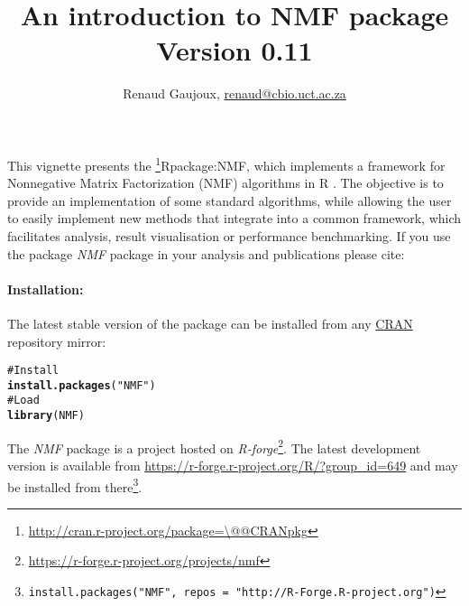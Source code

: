 \documentclass[a4paper]{article}\usepackage{graphicx, color}
\makeatletter
\newcommand{\hlfunctioncall}[1]{\textcolor[rgb]{0.501960784313725,0,0.329411764705882}{\textbf{#1}}}%
\newcommand{\hlstring}[1]{\textcolor[rgb]{0.6,0.6,1}{#1}}%
\newcommand{\hlcomment}[1]{\textcolor[rgb]{0.180392156862745,0.6,0.341176470588235}{#1}}%
\newenvironment{kframe}{%
 \def\at@end@of@kframe{}%
 \ifinner\ifhmode%
  \def\at@end@of@kframe{\end{minipage}}%
  \begin{minipage}{\columnwidth}%
 \fi\fi%
 \def\FrameCommand##1{\hskip\@totalleftmargin \hskip-\fboxsep
 \colorbox{shadecolor}{##1}\hskip-\fboxsep
     \hskip-\linewidth \hskip-\@totalleftmargin \hskip\columnwidth}%
 \MakeFramed {\advance\hsize-\width
   \@totalleftmargin\z@ \linewidth\hsize
   \@setminipage}}%
 {\par\unskip\endMakeFramed%
 \at@end@of@kframe}
\newenvironment{knitrout}{}{} %
\let\code=\texttt
\newcommand{\pkgname}[1]{\textit{#1}\xspace}
\newcommand{\Rpkg}[1]{\pkgname{#1} package\xspace}
\newcommand{\CRANurl}[1]{\url{http://cran.r-project.org/package=#1}}
\def\CRANpkg{\@ifstar\@CRANpkg\@@CRANpkg}
\def\@CRANpkg#1{\href{http://cran.r-project.org/package=#1}{\pkgname{#1}}\footnote{\CRANurl{#1}}}
\def\@@CRANpkg#1{\href{http://cran.r-project.org/package=#1}{\pkgname{#1}} package\footnote{\CRANurl{#1}}}
\def\citeCRANpkg{\@ifstar\@citeCRANpkg\@@citeCRANpkg}
\def\@citeCRANpkg#1{\CRANpkg{#1}\cite*{Rpackage:#1}}
\def\@@citeCRANpkg#1{\CRANpkg{#1}~\cite{Rpackage:#1}}
\newcommand{\nmfpack}{\Rpkg{NMF}}
\renewcommand{\cite}[1]{\parencite{#1}}
\makeatother
\begin{document}




\title{An introduction to NMF package\\\small Version
0.11}
\author{Renaud Gaujoux, \url{renaud@cbio.uct.ac.za}}

\maketitle

This vignette presents the \citeCRANpkg{NMF}, which implements a framework
for Nonnegative Matrix Factorization (NMF) algorithms in R \cite{R}.
The objective is to provide an implementation of some standard algorithms, while
allowing the user to easily implement new methods that integrate into a
common framework, which facilitates analysis, result visualisation or
performance benchmarking.
If you use the package \nmfpack in your analysis and publications please cite:

\bigskip
{}

\bigskip
\paragraph{Installation:} The latest stable version of the package can be installed from any
\href{http://cran.r-project.org}{CRAN} repository mirror:
\begin{knitrout}
\color{fgcolor}\begin{kframe}
\begin{alltt}
\hlcomment{# Install}
\hlfunctioncall{install.packages}(\hlstring{"NMF"})
\hlcomment{# Load}
\hlfunctioncall{library}(NMF)
\end{alltt}
\end{kframe}
\end{knitrout}

The \nmfpack is a project hosted on \emph{R-forge}\footnote{\url{https://r-forge.r-project.org/projects/nmf}}.
The latest development version is available from \url{https://r-forge.r-project.org/R/?group_id=649} and may be installed from there\footnote{\code{install.packages("NMF", repos = "http://R-Forge.R-project.org")}}.
\end{document}
